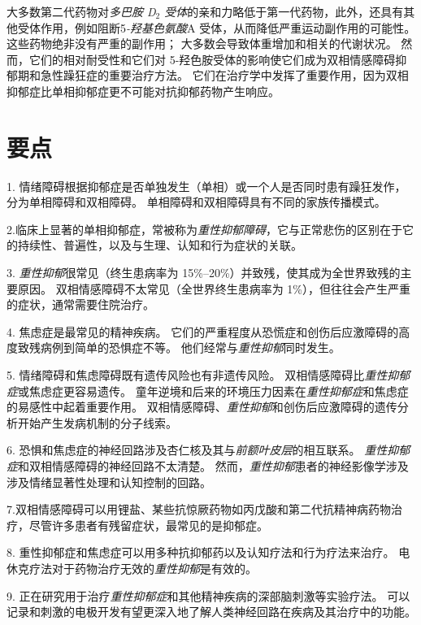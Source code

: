 大多数第二代药物对\textit{多巴胺 D$_2$ 受体}的亲和力略低于第一代药物，此外，还具有其他受体作用，例如阻断5\textit{-羟基色氨酸}A 受体，从而降低严重运动副作用的可能性。
这些药物绝非没有严重的副作用；
大多数会导致体重增加和相关的代谢状况。
然而，它们的相对耐受性和它们对 5-羟色胺受体的影响使它们成为双相情感障碍抑郁期和急性躁狂症的重要治疗方法。
它们在治疗学中发挥了重要作用，因为双相抑郁症比单相抑郁症更不可能对抗抑郁药物产生响应。



\section{要点}

1. 情绪障碍根据抑郁症是否单独发生（单相）或一个人是否同时患有躁狂发作，分为单相障碍和双相障碍。
单相障碍和双相障碍具有不同的家族传播模式。 


2.临床上显著的单相抑郁症，常被称为\textit{重性抑郁障碍}，它与正常悲伤的区别在于它的持续性、普遍性，以及与生理、认知和行为症状的关联。


3. \textit{重性抑郁}很常见（终生患病率为 15\%–20\%）并致残，使其成为全世界致残的主要原因。
双相情感障碍不太常见（全世界终生患病率为 1\%），但往往会产生严重的症状，通常需要住院治疗。 


4. 焦虑症是最常见的精神疾病。
它们的严重程度从恐慌症和创伤后应激障碍的高度致残病例到简单的恐惧症不等。
他们经常与\textit{重性抑郁}同时发生。


5. 情绪障碍和焦虑障碍既有遗传风险也有非遗传风险。
双相情感障碍比\textit{重性抑郁症}或焦虑症更容易遗传。
童年逆境和后来的环境压力因素在\textit{重性抑郁症}和焦虑症的易感性中起着重要作用。
双相情感障碍、\textit{重性抑郁}和创伤后应激障碍的遗传分析开始产生发病机制的分子线索。


6. 恐惧和焦虑症的神经回路涉及杏仁核及其与\textit{前额叶皮层}的相互联系。
\textit{重性抑郁症}和双相情感障碍的神经回路不太清楚。
然而，\textit{重性抑郁}患者的神经影像学涉及涉及情绪显著性处理和认知控制的回路。


7.双相情感障碍可以用锂盐、某些抗惊厥药物如丙戊酸和第二代抗精神病药物治疗，尽管许多患者有残留症状，最常见的是抑郁症。


8. 重性抑郁症和焦虑症可以用多种抗抑郁药以及认知疗法和行为疗法来治疗。
电休克疗法对于药物治疗无效的\textit{重性抑郁}是有效的。


9. 正在研究用于治疗\textit{重性抑郁症}和其他精神疾病的深部脑刺激等实验疗法。
可以记录和刺激的电极开发有望更深入地了解人类神经回路在疾病及其治疗中的功能。




